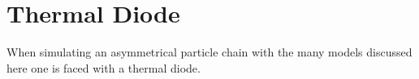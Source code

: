 
\chapter{Thermal Diode}

When simulating an asymmetrical particle chain with the many models discussed here one is faced with a thermal diode.